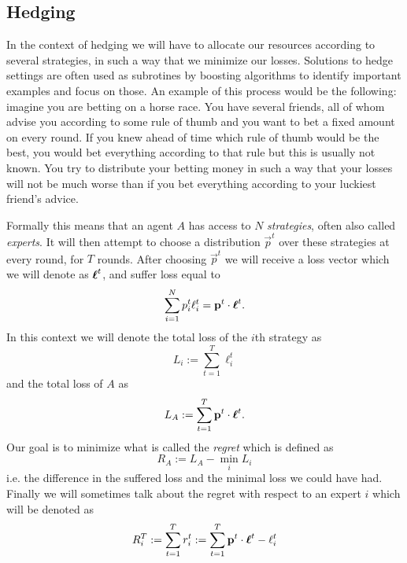 \subsection{Hedging}
\label{subsec:hedging}
In the context of hedging we will have to allocate our resources according to several strategies, in such a way that we minimize our losses. Solutions to hedge settings are often used as subrotines by boosting algorithms to identify important examples and focus on those. An example of this process would be the following: imagine you are betting on a horse race. You have several friends, all of whom advise you according to some rule of thumb and you want to bet a fixed amount on every round. If you knew ahead of time which rule of thumb would be the best, you would bet everything according to that rule but this is usually not known. You try to distribute your betting money in such a way that your losses will not be much worse than if you bet everything according to your luckiest friend's advice.  
\par Formally this means that an agent $A$ has access to $N$ \textit{strategies}, often also called \textit{experts}. It will then attempt to choose a distribution $\vec p^t$ over these strategies at every round, for $T$ rounds. After choosing $\vec p^t$ we will receive a loss vector which we will denote as $\boldsymbol\ell^t$, and suffer loss equal to $$\sum_{i=1}^N p^t_i\ell_i^t = \mathbf{p}^t \cdot \boldsymbol\ell^t.$$ In this context we will denote the total loss of the $i$th strategy as $$L_i:= \sum_{t=1}^T \ell^t_i$$ and the total loss of $A$ as $$L_A := \sum_{t=1}^T \mathbf{p}^t \cdot \boldsymbol\ell^t.$$ Our goal is to minimize what is called the \textit{regret} which is defined as $$R_A:=L_A - \min_i L_i$$ i.e. the difference in the suffered loss and the minimal loss we could have had. Finally we will sometimes talk about the regret with respect to an expert $i$ which will be denoted as $$R^T_i := \sum^T_{t=1}r_i^t := \sum^T_{t=1} \mathbf{p}^t \cdot \boldsymbol\ell^t -\ell_i^t$$

